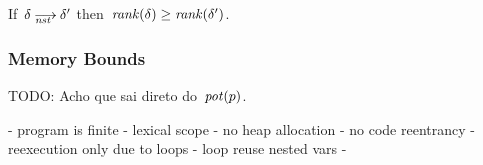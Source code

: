 \begin{lemma}
  \label{lem.x.rank-nst}
  If~$\delta\nst\delta'$ then~$\operatorname{\mathit{rank}}(\delta)\ge\operatorname{\mathit{rank}}(\delta')$.
\end{lemma}

\subsubsection*{Memory Bounds}

TODO: Acho que sai direto do~$\operatorname{\mathit{pot}}(p)$.

- program is finite
- lexical scope
    - no heap allocation
- no code reentrancy
    - reexecution only due to loops
    - loop reuse nested vars
-
